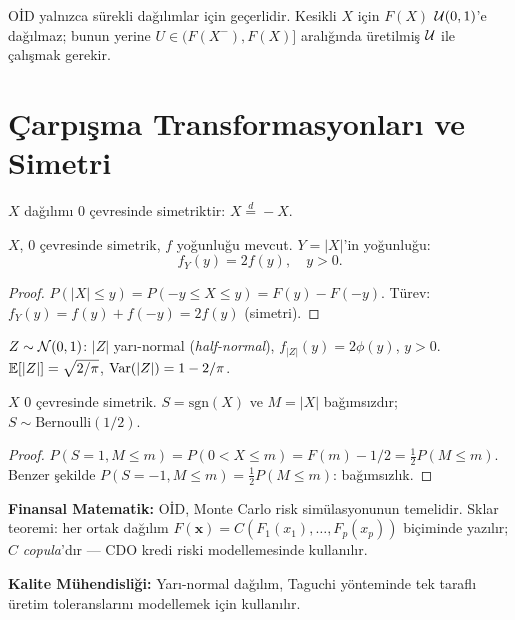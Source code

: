 \begin{hataanalizi}
OİD yalnızca sürekli dağılımlar için geçerlidir. Kesikli $X$ için $F(X)$ $\mathcal{U}(0,1)$'e dağılmaz; bunun yerine $U\in(F(X^-),F(X)]$ aralığında üretilmiş $\mathcal{U}$ ile çalışmak gerekir.
\end{hataanalizi}

\section{Çarpışma Transformasyonları ve Simetri}
\label{sec:simetri_donusumler}

\begin{tanim}\label{def:simetrik}
$X$ dağılımı $0$ çevresinde simetriktir: $X\overset{d}{=}-X$.
\end{tanim}

\begin{teorem}\label{thm:mutlak}
$X$, $0$ çevresinde simetrik, $f$ yoğunluğu mevcut. $Y=|X|$'in yoğunluğu:
\[
  f_Y(y) = 2f(y),\quad y>0.
\]
\end{teorem}

\begin{proof}
$P(|X|\leq y)=P(-y\leq X\leq y)=F(y)-F(-y)$. Türev: $f_Y(y)=f(y)+f(-y)=2f(y)$ (simetri).
\end{proof}

\begin{ornek}\label{ex:yari_normal}
$Z\sim\mathcal{N}(0,1)$: $|Z|$ yarı-normal (\emph{half-normal}), $f_{|Z|}(y)=2\phi(y)$, $y>0$.
$\mathbb{E}[|Z|]=\sqrt{2/\pi}$, $\operatorname{Var}(|Z|)=1-2/\pi$.
\end{ornek}

\begin{teorem}\label{thm:isaret_buyukluk}
$X$ $0$ çevresinde simetrik. $S=\mathrm{sgn}(X)$ ve $M=|X|$ bağımsızdır; $S\sim\mathrm{Bernoulli}(1/2)$.
\end{teorem}

\begin{proof}
$P(S=1,M\leq m)=P(0<X\leq m)=F(m)-1/2=\tfrac12 P(M\leq m)$. Benzer şekilde $P(S=-1,M\leq m)=\tfrac12 P(M\leq m)$: bağımsızlık.
\end{proof}

\begin{disiplinlerarasibaglan}
\textbf{Finansal Matematik:} OİD, Monte Carlo risk simülasyonunun temelidir. Sklar teoremi: her ortak dağılım $F(\mathbf{x})=C(F_1(x_1),\ldots,F_p(x_p))$ biçiminde yazılır; $C$ \emph{copula}'dır --- CDO kredi riski modellemesinde kullanılır.

\textbf{Kalite Mühendisliği:} Yarı-normal dağılım, Taguchi yönteminde tek taraflı üretim toleranslarını modellemek için kullanılır.
\end{disiplinlerarasibaglan}

